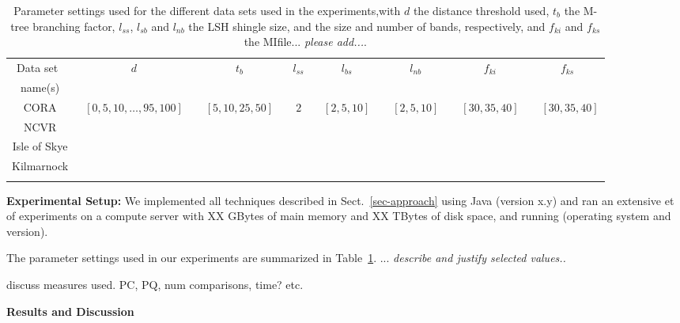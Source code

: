 \documentclass{llncs}
\begin{document}
\fi


\begin{table}[t]
\caption{Parameter settings used for the different data sets used in
   the experiments,with $d$ the distance threshold used, $t_b$ the
   M-tree branching factor, $l_{ss}$, $l_{sb}$ and $l_{nb}$ the LSH
   shingle size, and the size and number of bands, respectively, and
   $f_{ki}$ and $f_{ks}$ the MIfile... \emph{please add...}.}
 \label{table-parameters}
  \centering
  \begin{scriptsize}
  \begin{tabular}{cccccccc}
  \hline\noalign{\smallskip}
  Data set~ & $d$ & $t_b$ & $l_{ss}$ & $l_{bs}$ & $l_{nb}$ & 
    $f_{ki}$ & $f_{ks}$ \\
  name(s) & & & & & & & \\
  \noalign{\smallskip} \hline \noalign{\smallskip}
  CORA & ~$[0,5,10,\ldots,95,100]$~ & ~$[5,10,25,50]$~ & ~$2$~ &
    ~$[2,5,10]$~ & ~$[2,5,10]$~ & ~$[30,35,40]$~ & ~$[30,35,40]$ \\
  NCVR  &  \\
  Isle of Skye &  \\
  Kilmarnock  &  \\
  \noalign{\smallskip} \hline
  \end{tabular}
  \end{scriptsize}
\end{table}



\smallskip
\textbf{Experimental Setup:}
%
We implemented all techniques described in Sect.~\ref{sec-approach}
using Java (version x.y) and ran an extensive et of experiments on
a compute server with XX GBytes of main memory and XX TBytes of disk
space, and running (operating system and version).

The parameter settings used in our experiments are summarized in
Table~\ref{table-parameters}. ... \emph{describe and justify selected
values..}

discuss measures used. PC, PQ, num comparisons, time? etc.



\smallskip
\textbf{Results and Discussion}
\end{document}
